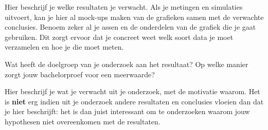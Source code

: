 Hier beschrijf je welke resultaten je verwacht. Als je metingen en simulaties uitvoert, kan je hier al mock-ups maken van de grafieken samen met de verwachte conclusies. Benoem zeker al je assen en de onderdelen van de grafiek die je gaat gebruiken. Dit zorgt ervoor dat je concreet weet welk soort data je moet verzamelen en hoe je die moet meten.

Wat heeft de doelgroep van je onderzoek aan het resultaat? Op welke manier zorgt jouw bachelorproef voor een meerwaarde?

Hier beschrijf je wat je verwacht uit je onderzoek, met de motivatie waarom. Het is \textbf{niet} erg indien uit je onderzoek andere resultaten en conclusies vloeien dan dat je hier beschrijft: het is dan juist interessant om te onderzoeken waarom jouw hypothesen niet overeenkomen met de resultaten.

